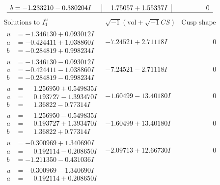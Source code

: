 \documentclass[1p]{elsarticle_modified}
\theoremstyle{definition}
\newcommand{\I}{\sqrt{-1}}
\begin{document}
$$\begin{array}{c|c|c}
\begin{aligned}
b &= -1.233210 - 0.380204 I\end{aligned}
 & \phantom{-}1.75057 + 1.55337 I & \phantom{-0.000000 } 0\\
 \hline 
 \end{array}$$\newpage$$\begin{array}{c|c|c}  
\text{Solutions to }I^u_{1}& \I (\text{vol} + \sqrt{-1}CS) & \text{Cusp shape}\\
 \hline 
\begin{aligned}
u &= -1.346130 + 0.093012 I \\
a &= -0.424411 + 1.038860 I \\
b &= -0.284819 + 0.998234 I\end{aligned}
 & -7.24521 + 2.71118 I & \phantom{-0.000000 } 0 \\ \hline\begin{aligned}
u &= -1.346130 - 0.093012 I \\
a &= -0.424411 - 1.038860 I \\
b &= -0.284819 - 0.998234 I\end{aligned}
 & -7.24521 - 2.71118 I & \phantom{-0.000000 } 0 \\ \hline\begin{aligned}
u &= \phantom{-}1.256950 + 0.549835 I \\
a &= \phantom{-}0.193727 - 1.393470 I \\
b &= \phantom{-}1.36822 - 0.77314 I\end{aligned}
 & -1.60499 - 13.40180 I & \phantom{-0.000000 } 0 \\ \hline\begin{aligned}
u &= \phantom{-}1.256950 - 0.549835 I \\
a &= \phantom{-}0.193727 + 1.393470 I \\
b &= \phantom{-}1.36822 + 0.77314 I\end{aligned}
 & -1.60499 + 13.40180 I & \phantom{-0.000000 } 0 \\ \hline\begin{aligned}
u &= -0.300969 + 1.340690 I \\
a &= \phantom{-}0.192114 - 0.208650 I \\
b &= -1.211350 - 0.431036 I\end{aligned}
 & -2.09713 + 12.66730 I & \phantom{-0.000000 } 0 \\ \hline\begin{aligned}
u &= -0.300969 - 1.340690 I \\
a &= \phantom{-}0.192114 + 0.208650 I \\

\end{aligned}
\end{array}$$
\end{document}
